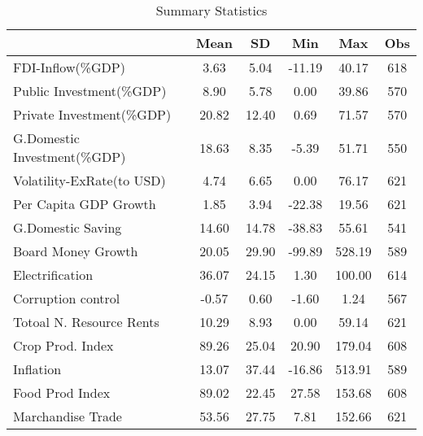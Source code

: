 \begin{table}[htbp]\centering
\def\sym#1{\ifmmode^{#1}\else\(^{#1}\)\fi}
\caption{Summary Statistics \label{table1stata}}
\begin{tabular}{l*{1}{ccccc}}
\toprule
            &        Mean&          SD&         Min&         Max&         Obs\\
\midrule
FDI-Inflow(\%GDP)&        3.63&        5.04&      -11.19&       40.17&         618\\
Public Investment(\%GDP)&        8.90&        5.78&        0.00&       39.86&         570\\
Private Investment(\%GDP)&       20.82&       12.40&        0.69&       71.57&         570\\
G.Domestic Investment(\%GDP)&       18.63&        8.35&       -5.39&       51.71&         550\\
Volatility-ExRate(to USD)&        4.74&        6.65&        0.00&       76.17&         621\\
Per Capita GDP Growth&        1.85&        3.94&      -22.38&       19.56&         621\\
G.Domestic Saving&       14.60&       14.78&      -38.83&       55.61&         541\\
Board Money Growth&       20.05&       29.90&      -99.89&      528.19&         589\\
Electrification&       36.07&       24.15&        1.30&      100.00&         614\\
Corruption control&       -0.57&        0.60&       -1.60&        1.24&         567\\
Totoal N. Resource Rents&       10.29&        8.93&        0.00&       59.14&         621\\
Crop Prod. Index&       89.26&       25.04&       20.90&      179.04&         608\\
Inflation   &       13.07&       37.44&      -16.86&      513.91&         589\\
Food Prod Index&       89.02&       22.45&       27.58&      153.68&         608\\
Marchandise Trade&       53.56&       27.75&        7.81&      152.66&         621\\
\bottomrule
\end{tabular}
\end{table}
